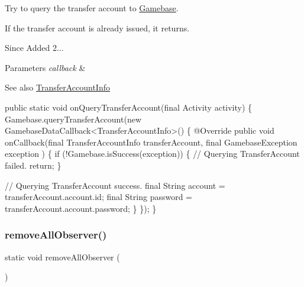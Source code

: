Try to query the transfer account to \hyperlink{classcom_1_1toast_1_1android_1_1gamebase_1_1_gamebase}{Gamebase}. 

If the transfer account is already issued, it returns.

\begin{DoxySince}{Since}
Added 2... 
\end{DoxySince}

\begin{DoxyParams}{Parameters}
{\em callback} & \\
\hline
\end{DoxyParams}
\begin{DoxySeeAlso}{See also}
\hyperlink{}{Transfer\+Account\+Info}
\end{DoxySeeAlso}

\begin{DoxyCode}
\textcolor{keyword}{public} \textcolor{keyword}{static} \textcolor{keywordtype}{void} onQueryTransferAccount(\textcolor{keyword}{final} Activity activity) \{
    Gamebase.queryTransferAccount(\textcolor{keyword}{new} GamebaseDataCallback<TransferAccountInfo>() \{
        @Override
        \textcolor{keyword}{public} \textcolor{keywordtype}{void} onCallback(\textcolor{keyword}{final} TransferAccountInfo transferAccount, \textcolor{keyword}{final} GamebaseException exception
      ) \{
            \textcolor{keywordflow}{if} (!Gamebase.isSuccess(exception)) \{
                \textcolor{comment}{// Querying TransferAccount failed.}
                \textcolor{keywordflow}{return};
            \}

            \textcolor{comment}{// Querying TransferAccount success.}
            \textcolor{keyword}{final} String account = transferAccount.account.id;
            \textcolor{keyword}{final} String password = transferAccount.account.password;
        \}
    \});
\}
\end{DoxyCode}
 \mbox{\label{classcom_1_1toast_1_1android_1_1gamebase_1_1_gamebase_a73db608847a6f59086a19b7be9fb0b7f}} 
\subsubsection{\texorpdfstring{remove\+All\+Observer()}{removeAllObserver()}}
{\footnotesize\ttfamily static void remove\+All\+Observer (\begin{DoxyParamCaption}{ }\end{DoxyParamCaption})\hspace{0.3cm}{\ttfamily [static]}}




